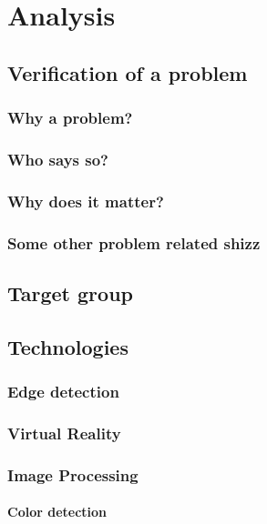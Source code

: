 \chapter{Analysis}
	
	
	\section{Verification of a problem}\label{sec:verification}
		\subsection{Why a problem?}
		
		\subsection{Who says so?}
		
		\subsection{Why does it matter?}
		
		\subsection{Some other problem related shizz}

	\section{Target group}\label{sec:targetGroup}

	\section{Technologies}\label{sec:technologies}
		\subsection{Edge detection}
		\subsection{Virtual Reality}
		\subsection{Image Processing}
			\subsubsection{Color detection}
